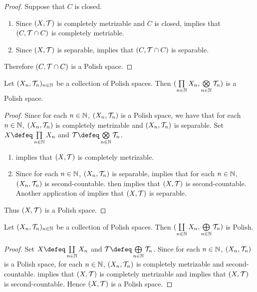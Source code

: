 \documentclass{book}
\begin{document}
\begin{proof}
	Suppose that $C$ is closed. 
	\begin{enumerate}
		\item Since $(X, \mathcal{T})$ is completely metrizable and $C$ is closed,  implies that $(C, \mathcal{T} \cap C)$ is completely metriable.  
		\item Since $(X, \mathcal{T})$ is separable,  implies that $(C, \mathcal{T} \cap C)$ is separable.
	\end{enumerate}
	Therefore $(C, \mathcal{T} \cap C)$ is a Polish space.
\end{proof}

\begin{ex} 
	Let $(X_n, \mathcal{T}_n)_{n \in \mathbb{N}}$ be a collection of Polish spaces. Then $(\prod\limits_{n \in \mathbb{N}} X_n, \bigotimes\limits_{n \in \mathbb{N}} \mathcal{T}_n)$ is a Polish space.  
\end{ex}

\begin{proof} Since for each $n \in \mathbb{N}$, $(X_n, \mathcal{T}_n)$ is a Polish space, we have that for each $n \in \mathbb{N}$, $(X_n, \mathcal{T}_n)$ is completely metrizable and $(X_n, \mathcal{T}_n)$ is separable. Set $X \defeq \prod\limits_{n \in \N} X_n$ and $\MT \defeq \bigotimes\limits_{n \in \N} \MT_{n}$. 
	\begin{enumerate}
		\item {} implies that $(X, \mathcal{T})$ is completely metrizable. 
		\item Since for each $n \in \mathbb{N}$, $(X_n, \mathcal{T}_n)$ is separable,  implies that for each $n \in \mathbb{N}$, $(X_n, \mathcal{T}_n)$ is second-countable.  then implies that $(X, \mathcal{T})$ is second-countable. Another application of  implies that $(X, \mathcal{T})$ is separable. 
	\end{enumerate}
	Thus $(X, \mathcal{T})$ is a Polish space.
\end{proof}

\begin{ex} 
	Let $(X_n, \mathcal{T}_n)_{n \in \mathbb{N}}$ be a collection of Polish spaces. Then $(\coprod\limits_{n \in \mathbb{N}} X_n, \bigoplus\limits_{n \in \mathbb{N}} \mathcal{T}_n)$ is Polish.  
\end{ex}

\begin{proof} 
	Set $X \defeq \coprod\limits_{n \in \N} X_n$ and $\MT \defeq \bigoplus\limits_{n \in \N} \MT_n$. Since for each $n \in \mathbb{N}$, $(X_n, \mathcal{T}_n)$ is a Polish space, for each $n \in \mathbb{N}$, $(X_n, \mathcal{T}_n)$ is completely metrizable and second-countable.  implies that $(X, \mathcal{T})$ is completely metrizable and  implies that $(X, \mathcal{T})$ is second-countable. Hence $(X, \mathcal{T})$ is a Polish space.
\end{proof}
\end{document}
